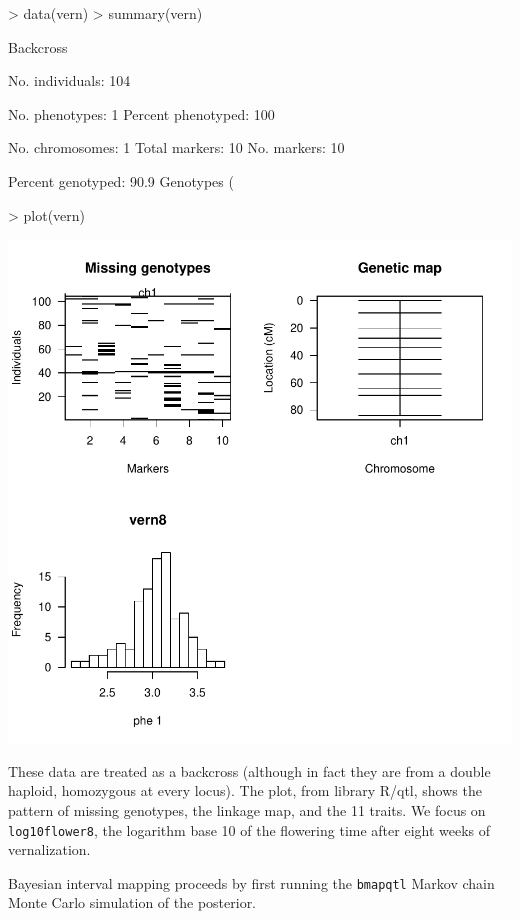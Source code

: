 \documentclass{article}
\begin{document}
\begin{Schunk}
\begin{Sinput}
> data(vern)
> summary(vern)
\end{Sinput}
\begin{Soutput}
    Backcross

    No. individuals:  104 

    No. phenotypes:   1 
    Percent phenotyped:  100 

    No. chromosomes:  1 
    Total markers:    10 
    No. markers:      10 

    Percent genotyped:  90.9 
    Genotypes (%
\end{Soutput}
\begin{Sinput}
> plot(vern)
\end{Sinput}
\end{Schunk}
\includegraphics{bim-003}

These data are treated as a backcross (although in fact they are from
a double haploid, homozygous at every locus). The plot, from library
R/qtl, shows the pattern of missing genotypes, the linkage map, and
the 11 traits. We focus on \texttt{log10flower8}, the logarithm base
10 of the flowering time after eight weeks of vernalization.

Bayesian interval mapping proceeds by first running the
\texttt{bmapqtl} Markov chain Monte Carlo simulation of the posterior.
\end{document}
